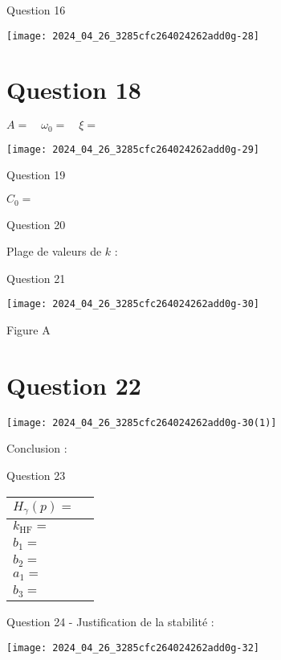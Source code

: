 Question 16

\begin{center}
\texttt{[image: 2024\_04\_26\_3285cfc264024262add0g-28]}
\end{center}

\section*{Question 18}
$A=\quad \omega_{0}=\quad \xi=$

\begin{center}
\texttt{[image: 2024\_04\_26\_3285cfc264024262add0g-29]}
\end{center}

Question 19

$C_{0}=$

Question 20

Plage de valeurs de $k$ :

Question 21

\begin{center}
\texttt{[image: 2024\_04\_26\_3285cfc264024262add0g-30]}
\end{center}

Figure A

\section*{Question 22}
\begin{center}
\texttt{[image: 2024\_04\_26\_3285cfc264024262add0g-30(1)]}
\end{center}

Conclusion :

Question 23

\begin{center}
\begin{tabular}{|l|l|}
\hline
$H_{\gamma}(p)=$ \\
\hline
$k_{\mathrm{HF}}=$ \\
\hline
$b_{1}=$ \\
\hline
$b_{2}=$ \\
\hline
$a_{1}=$ \\
\hline
$b_{3}=$ \\
\hline
\end{tabular}
\end{center}

Question 24 - Justification de la stabilité :

\begin{center}
\texttt{[image: 2024\_04\_26\_3285cfc264024262add0g-32]}
\end{center}

